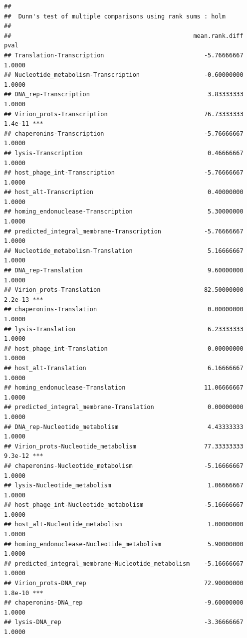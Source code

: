 \documentclass[
]{article}
\begin{document}
\begin{verbatim}
## 
##  Dunn's test of multiple comparisons using rank sums : holm  
## 
##                                                   mean.rank.diff    pval    
## Translation-Transcription                            -5.76666667  1.0000    
## Nucleotide_metabolism-Transcription                  -0.60000000  1.0000    
## DNA_rep-Transcription                                 3.83333333  1.0000    
## Virion_prots-Transcription                           76.73333333 1.4e-11 ***
## chaperonins-Transcription                            -5.76666667  1.0000    
## lysis-Transcription                                   0.46666667  1.0000    
## host_phage_int-Transcription                         -5.76666667  1.0000    
## host_alt-Transcription                                0.40000000  1.0000    
## homing_endonuclease-Transcription                     5.30000000  1.0000    
## predicted_integral_membrane-Transcription            -5.76666667  1.0000    
## Nucleotide_metabolism-Translation                     5.16666667  1.0000    
## DNA_rep-Translation                                   9.60000000  1.0000    
## Virion_prots-Translation                             82.50000000 2.2e-13 ***
## chaperonins-Translation                               0.00000000  1.0000    
## lysis-Translation                                     6.23333333  1.0000    
## host_phage_int-Translation                            0.00000000  1.0000    
## host_alt-Translation                                  6.16666667  1.0000    
## homing_endonuclease-Translation                      11.06666667  1.0000    
## predicted_integral_membrane-Translation               0.00000000  1.0000    
## DNA_rep-Nucleotide_metabolism                         4.43333333  1.0000    
## Virion_prots-Nucleotide_metabolism                   77.33333333 9.3e-12 ***
## chaperonins-Nucleotide_metabolism                    -5.16666667  1.0000    
## lysis-Nucleotide_metabolism                           1.06666667  1.0000    
## host_phage_int-Nucleotide_metabolism                 -5.16666667  1.0000    
## host_alt-Nucleotide_metabolism                        1.00000000  1.0000    
## homing_endonuclease-Nucleotide_metabolism             5.90000000  1.0000    
## predicted_integral_membrane-Nucleotide_metabolism    -5.16666667  1.0000    
## Virion_prots-DNA_rep                                 72.90000000 1.8e-10 ***
## chaperonins-DNA_rep                                  -9.60000000  1.0000    
## lysis-DNA_rep                                        -3.36666667  1.0000    

\end{verbatim}
\end{document}
